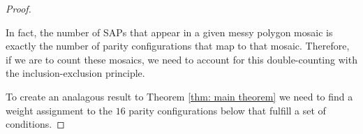 \documentclass[12pt]{article}
\theoremstyle{plain}
\theoremstyle{definition}
\theoremstyle{remark}
\theoremstyle{definition}
\newcommand{\cellA}[4]{ \draw[thick] ( #1 , #2 ) rectangle ( #3 , #4 ); \draw[red, thick] (#3 * 0.5 + #1 * 0.5 , #2) -- (#3, #4 * 0.5 + #2 * 0.5);}
\newcommand{\cellB}[4]{ \draw[thick] ( #1 , #2 ) rectangle ( #3 , #4 ); \draw[red, thick] (#3 * 0.5 + #1 * 0.5 , #2) -- (#1, #4 * 0.5 + #2 * 0.5);}
\newcommand{\cellC}[4]{ \draw[thick] ( #1 , #2 ) rectangle ( #3 , #4 ); \draw[red, thick] (#3 * 0.5 + #1 * 0.5 , #4) -- (#1, #4 * 0.5 + #2 * 0.5);}
\newcommand{\cellD}[4]{ \draw[thick] ( #1 , #2 ) rectangle ( #3 , #4 ); \draw[red, thick] (#3 * 0.5 + #1 * 0.5 , #4) -- (#3, #4 * 0.5 + #2 * 0.5);}
\begin{document}
\begin{proof}
\begin{center}
\end{center}

In fact, the number of SAPs that appear in a given messy polygon mosaic is exactly the number of parity configurations that map to that mosaic. Therefore, if we are to count these mosaics, we need to account for this double-counting with the inclusion-exclusion principle.  

To create an analagous result to Theorem \ref{thm: main theorem} we need to find a weight assignment to the $16$ parity configurations below that fulfill a set of conditions.


\end{proof}
\end{document}

